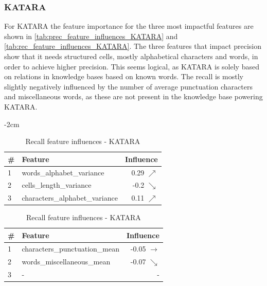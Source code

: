 

\subsubsection{KATARA}
For KATARA the feature importance for the three most impactful features are shown in \autoref{tab:prec_feature_influences_KATARA} and \autoref{tab:rec_feature_influences_KATARA}. The three features that impact precision show that it needs structured cells, mostly alphabetical characters and words, in order to achieve higher precision. This seems logical, as KATARA is solely based on relations in knowledge bases based on known words. The recall is mostly slightly negatively influenced by the number of average punctuation characters and miscellaneous words, as these are not present in the knowledge base powering KATARA.

\begin{table}[H]
	\centering
	\addtolength{\leftskip} {-2cm}
	\addtolength{\rightskip}{-2cm}
	\captionsetup[subtable]{position = below}
	\captionsetup[table]{position=top}
	\caption{Top feature influences - KATARA}
	\label{tab:feature_influences_KATARA}
		\begin{subtable}{0.5\linewidth}
		\centering
\begin{tabular}{llr}
\toprule
 \# &                         Feature &        Influence \\
\midrule
 1 &       words\_alphabet\_variance &  0.29 $\nearrow$ \\
 2 &         cells\_length\_variance &  -0.2 $\searrow$ \\
 3 &  characters\_alphabet\_variance &  0.11 $\nearrow$ \\
\bottomrule
\end{tabular}

		\caption{Precision feature influences - KATARA}
		\label{tab:prec_feature_influences_KATARA}
	\end{subtable}
	\hspace*{4em}
	\begin{subtable}{0.5\linewidth}
		\centering
\begin{tabular}{llr}
\toprule
 \# &                        Feature &            Influence \\
\midrule
 1 &  characters\_punctuation\_mean &  -0.05 $\rightarrow$ \\
 2 &     words\_miscellaneous\_mean &     -0.07 $\searrow$ \\
 3 &            - &      - \\
\bottomrule
\end{tabular}
		\caption{Recall feature influences - KATARA}
		\label{tab:rec_feature_influences_KATARA}
	\end{subtable}%
\end{table}

